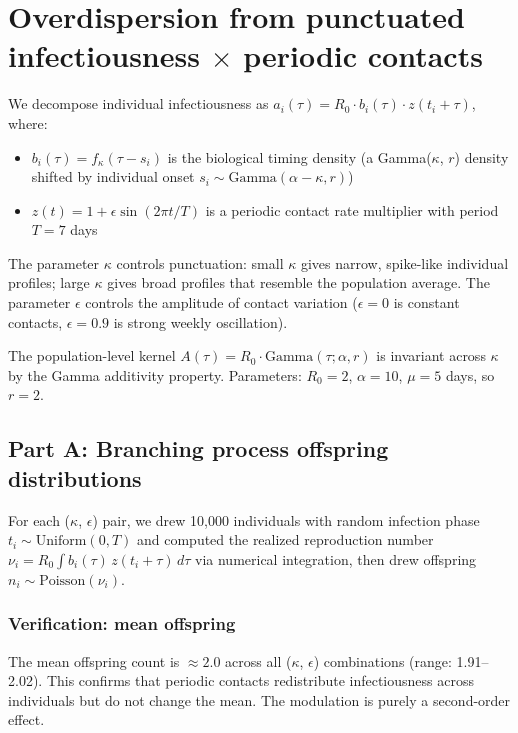 \documentclass[11pt]{article}
\begin{document}
\section{Overdispersion from punctuated infectiousness $\times$ periodic contacts}

We decompose individual infectiousness as $a_i(\tau) = R_0 \cdot b_i(\tau) \cdot z(t_i + \tau)$, where:
\begin{itemize}
\item $b_i(\tau) = f_\kappa(\tau - s_i)$ is the biological timing density (a Gamma($\kappa$, $r$) density shifted by individual onset $s_i \sim \text{Gamma}(\alpha - \kappa, r)$)
\item $z(t) = 1 + \epsilon \sin(2\pi t / T)$ is a periodic contact rate multiplier with period $T = 7$ days
\end{itemize}

The parameter $\kappa$ controls punctuation: small $\kappa$ gives narrow, spike-like individual profiles; large $\kappa$ gives broad profiles that resemble the population average. The parameter $\epsilon$ controls the amplitude of contact variation ($\epsilon = 0$ is constant contacts, $\epsilon = 0.9$ is strong weekly oscillation).

The population-level kernel $A(\tau) = R_0 \cdot \text{Gamma}(\tau; \alpha, r)$ is invariant across $\kappa$ by the Gamma additivity property. Parameters: $R_0 = 2$, $\alpha = 10$, $\mu = 5$ days, so $r = 2$.

\subsection{Part A: Branching process offspring distributions}

For each ($\kappa$, $\epsilon$) pair, we drew 10,000 individuals with random infection phase $t_i \sim \text{Uniform}(0, T)$ and computed the realized reproduction number $\nu_i = R_0 \int b_i(\tau) \, z(t_i + \tau) \, d\tau$ via numerical integration, then drew offspring $n_i \sim \text{Poisson}(\nu_i)$.

\subsubsection{Verification: mean offspring}

The mean offspring count is $\approx 2.0$ across all ($\kappa$, $\epsilon$) combinations (range: 1.91--2.02). This confirms that periodic contacts redistribute infectiousness across individuals but do not change the mean. The modulation is purely a second-order effect.
\end{document}
